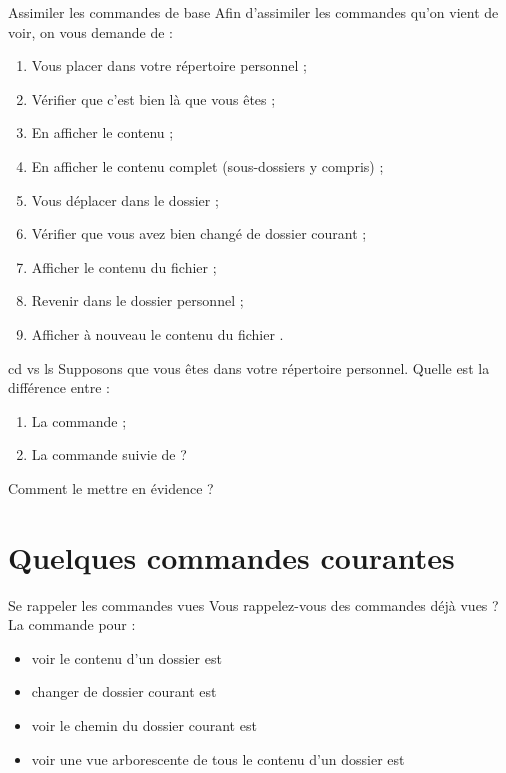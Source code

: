\documentclass[a4paper,11pt]{style-esi/td}
\begin{document}
		\begin{Exercice}{Assimiler les commandes de base}
			Afin d'assimiler les commandes qu'on vient de voir,
			on vous demande de :
			\begin{enumerate}
				\item Vous placer dans votre répertoire personnel ;
				\item Vérifier que c'est bien là que vous êtes ;
				\item En afficher le contenu ;
				\item En afficher le contenu complet (sous-dossiers y compris) ;
				\item Vous déplacer dans le dossier  ;
				\item Vérifier que vous avez bien changé de dossier courant ;
				\item Afficher le contenu du fichier  ;
				\item Revenir dans le dossier personnel ;
				\item Afficher à nouveau le contenu du fichier  .
			\end{enumerate}
		\end{Exercice}

		\begin{Exercice}{cd vs ls}
			Supposons que vous êtes dans votre répertoire personnel.
			Quelle est la différence entre :
			\begin{enumerate}
				\item La commande  ;
				\item La commande  suivie de  ?
			\end{enumerate}
			Comment le mettre en évidence ?
		\end{Exercice}			


	\section{Quelques commandes courantes}

		\begin{Exercice}{Se rappeler les commandes vues}		
			Vous rappelez-vous des commandes déjà vues ?
			La commande pour :
			\begin{itemize}
			\item voir le contenu d'un dossier est  
			\item changer de dossier courant est  
			\item voir le chemin du dossier courant est  
			\item voir une vue arborescente de tous le contenu d'un dossier est  
			\end{itemize}
		\end{Exercice}
\end{document}
